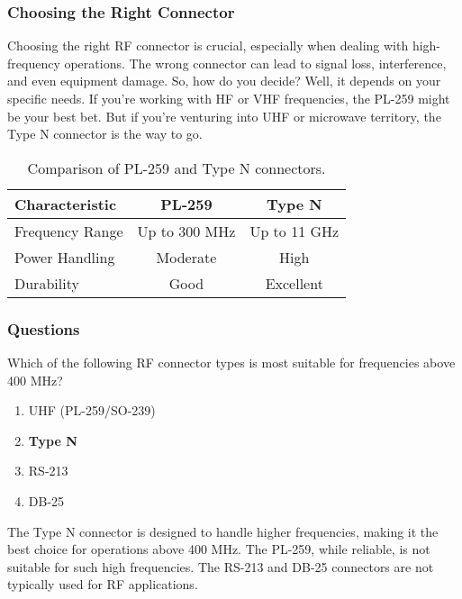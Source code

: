 \subsubsection*{Choosing the Right Connector}
Choosing the right RF connector is crucial, especially when dealing with high-frequency operations. The wrong connector can lead to signal loss, interference, and even equipment damage. So, how do you decide? Well, it depends on your specific needs. If you're working with HF or VHF frequencies, the PL-259 might be your best bet. But if you're venturing into UHF or microwave territory, the Type N connector is the way to go.

\begin{table}[h!]
    \centering
    \begin{tabular}{|l|c|c|}
        \hline
        \textbf{Characteristic} & \textbf{PL-259} & \textbf{Type N} \\
        \hline
        Frequency Range & Up to 300 MHz & Up to 11 GHz \\
        Power Handling & Moderate & High \\
        Durability & Good & Excellent \\
        \hline
    \end{tabular}
    \caption{Comparison of PL-259 and Type N connectors.}
    \label{tab:connector-comparison}
\end{table}

\subsubsection*{Questions}

\begin{tcolorbox}[colback=gray!10!white,colframe=black!75!black,title={T9B06}]
    Which of the following RF connector types is most suitable for frequencies above 400 MHz?
    \begin{enumerate}[label=\Alph*),noitemsep]
        \item UHF (PL-259/SO-239)
        \item \textbf{Type N}
        \item RS-213
        \item DB-25
    \end{enumerate}
\end{tcolorbox}

The Type N connector is designed to handle higher frequencies, making it the best choice for operations above 400 MHz. The PL-259, while reliable, is not suitable for such high frequencies. The RS-213 and DB-25 connectors are not typically used for RF applications.

